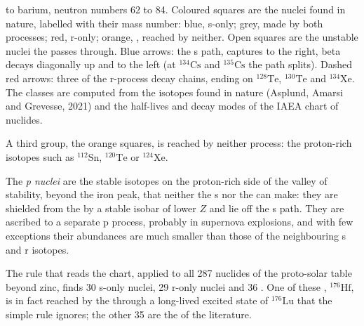 \begin{omfigure}
{to barium, neutron numbers 62 to 84. Coloured squares are the nuclei found in nature, labelled
with their mass number: blue, s-only; grey, made by both processes; red,
r-only; orange, , reached by neither. Open squares are the
unstable nuclei the  passes through. Blue arrows: the s path,
captures to the right, beta decays diagonally up and to the left (at
$^{134}\mathrm{Cs}$ and $^{135}\mathrm{Cs}$ the path splits). Dashed red
arrows: three of the r-process decay chains, ending on
$^{128}\mathrm{Te}$, $^{130}\mathrm{Te}$ and $^{134}\mathrm{Xe}$. The
classes are computed from the isotopes found in nature (Asplund,
Amarsi and Grevesse, 2021) and the half-lives and decay modes of the
IAEA chart of nuclides.}\label{fig:b3:origin-of-elements:chart}
\end{omfigure}

A third group, the orange squares, is reached by neither process: the
proton-rich isotopes such as $^{112}\mathrm{Sn}$, $^{120}\mathrm{Te}$
or $^{124}\mathrm{Xe}$.

\begin{definition}[p nuclei]\label{def:b3:origin-of-elements:p-process}
The \emph{p nuclei} are the stable isotopes on the
proton-rich side of the valley of stability, beyond the iron peak, that
neither the s nor the  can make: they are shielded from the  by a stable isobar of lower $Z$ and lie off the s path. They are
ascribed to a separate p process, probably in supernova explosions, and
with few exceptions their abundances are much smaller than those of the
neighbouring s and r isotopes.
\end{definition}

The rule that reads the chart, applied to all 287 nuclides of the
proto-solar table beyond zinc, finds 30 s-only nuclei, 29 r-only nuclei
and 36 . One of these , $^{176}\mathrm{Hf}$, is in fact
reached by the  through a long-lived excited state of
$^{176}\mathrm{Lu}$ that the simple rule ignores; the other 35 are the  of the literature.

